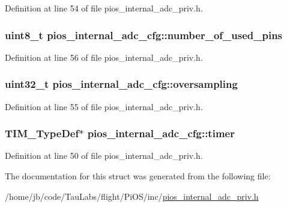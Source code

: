 \-Definition at line 54 of file pios\-\_\-internal\-\_\-adc\-\_\-priv.\-h.

\hypertarget{structpios__internal__adc__cfg_ad246cb549f9a270c69555a68f825212b}{
\subsubsection[{number\-\_\-of\-\_\-used\-\_\-pins}]{\setlength{\rightskip}{0pt plus 5cm}uint8\-\_\-t {\bf pios\-\_\-internal\-\_\-adc\-\_\-cfg\-::number\-\_\-of\-\_\-used\-\_\-pins}}}\label{structpios__internal__adc__cfg_ad246cb549f9a270c69555a68f825212b}


\-Definition at line 56 of file pios\-\_\-internal\-\_\-adc\-\_\-priv.\-h.

\hypertarget{structpios__internal__adc__cfg_a1c08390ebe63500dd873bd5e6aeb1aa6}{
\subsubsection[{oversampling}]{\setlength{\rightskip}{0pt plus 5cm}uint32\-\_\-t {\bf pios\-\_\-internal\-\_\-adc\-\_\-cfg\-::oversampling}}}\label{structpios__internal__adc__cfg_a1c08390ebe63500dd873bd5e6aeb1aa6}


\-Definition at line 55 of file pios\-\_\-internal\-\_\-adc\-\_\-priv.\-h.

\hypertarget{structpios__internal__adc__cfg_a4b3536fcdfcd39d13b1473995bf9fe03}{
\subsubsection[{timer}]{\setlength{\rightskip}{0pt plus 5cm}\-T\-I\-M\-\_\-\-Type\-Def$\ast$ {\bf pios\-\_\-internal\-\_\-adc\-\_\-cfg\-::timer}}}\label{structpios__internal__adc__cfg_a4b3536fcdfcd39d13b1473995bf9fe03}


\-Definition at line 50 of file pios\-\_\-internal\-\_\-adc\-\_\-priv.\-h.



\-The documentation for this struct was generated from the following file\-:\begin{DoxyCompactItemize}
\item 
/home/jb/code/\-Tau\-Labs/flight/\-Pi\-O\-S/inc/\hyperlink{pios__internal__adc__priv_8h}{pios\-\_\-internal\-\_\-adc\-\_\-priv.\-h}\end{DoxyCompactItemize}
